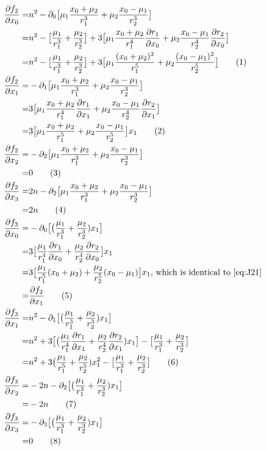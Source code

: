 \documentclass[]{article}
\newcommand\numberthis{\addtocounter{equation}{1}\tag{\theequation}}
\begin{document}
\begin{align*}
	\frac{\partial f_2}{\partial x_0} =& n^2 - \partial_0\big[\mu_1\frac{x_0+\mu_2}{r_1^3} + \mu_2\frac{x_0-\mu_1}{r_2^3}\big]\\
	=& n^2 -\big[\frac{\mu_1}{r_1^3} + \frac{\mu_2}{r_2^3}\big] + 3\big[\mu_1\frac{x_0+\mu_2}{r_1^4}\frac{\partial r_1}{\partial x_0} + \mu_2\frac{x_0-\mu_1}{r_2^4}\frac{\partial r_2}{\partial x_0}\big]\\
	=& n^2 -\big[\frac{\mu_1}{r_1^3} + \frac{\mu_2}{r_2^3}\big] + 3\big[\mu_1\frac{(x_0+\mu_2)^2}{r_1^5} + \mu_2\frac{(x_0-\mu_1)^2}{r_2^5}\big]\numberthis \label{eq:J20}\\
	\frac{\partial f_2}{\partial x_1} =& - \partial_1\big[\mu_1\frac{x_0+\mu_2}{r_1^3} + \mu_2\frac{x_0-\mu_1}{r_2^3}\big]\\
	=& 3 \big[\mu_1\frac{x_0+\mu_2}{r_1^4}\frac{\partial r_1}{\partial x_1} + \mu_2\frac{x_0-\mu_1}{r_2^4}\frac{\partial r_2}{\partial x_1}\big]\\
	=& 3 \big[\mu_1\frac{x_0+\mu_2}{r_1^5} + \mu_2\frac{x_0-\mu_1}{r_2^5}\big]x_1\numberthis \label{eq:J21}\\
	\frac{\partial f_2}{\partial x_2} =& - \partial_2\big[\mu_1\frac{x_0+\mu_2}{r_1^3} + \mu_2\frac{x_0-\mu_1}{r_2^3}\big]\\
	=& 0\numberthis \label{eq:J22}\\
	\frac{\partial f_2}{\partial x_3} =& 2n - \partial_2\big[\mu_1\frac{x_0+\mu_2}{r_1^3} + \mu_2\frac{x_0-\mu_1}{r_2^3}\big]\\
	=& 2n\numberthis \label{eq:J23}\\
	\frac{\partial f_3}{\partial x_0} =& - \partial_0\big[\big(\frac{\mu_1}{r_1^3} + \frac{\mu_2}{r_2^3})x_1\big]\\
	=& 3\big[\frac{\mu_1}{r_1^4}\frac{\partial r_1}{\partial x_0} + \frac{\mu_2}{r_2^4}\frac{\partial r_2}{\partial x_0}\big]x_1\\
	=& 3\big[\frac{\mu_1}{r_1^5}(x_0+\mu_2) + \frac{\mu_2}{r_2^5}(x_0-\mu_1)\big] x_1 \text{, which is identical to \eqref{eq:J21}} \\
	=& \frac{\partial f_2}{\partial x_1} \numberthis \label{eq:J30}\\
	\frac{\partial f_3}{\partial x_1} =& n^2- \partial_1\big[\big(\frac{\mu_1}{r_1^3} + \frac{\mu_2}{r_2^3})x_1\big]\\
	=& n^2  + 3 \big[\big(\frac{\mu_1}{r_1^4}\frac{\partial r_1}{\partial x_1} + \frac{\mu_2}{r_2^4}\frac{\partial r_2}{\partial x_1})x_1\big] - \big[\frac{\mu_1}{r_1^3} + \frac{\mu_2}{r_2^3}\big]\\
	=& n^2  + 3 \big(\frac{\mu_1}{r_1^5} + \frac{\mu_2}{r_2^5})x_1^2 - \big[\frac{\mu_1}{r_1^3} + \frac{\mu_2}{r_2^3}\big] \numberthis \label{eq:J31}\\
	\frac{\partial f_3}{\partial x_2} =& -2n - \partial_2\big[\big(\frac{\mu_1}{r_1^3} + \frac{\mu_2}{r_2^3})x_1\big]\\
	=& -2n \numberthis \label{eq:J32}\\
	\frac{\partial f_3}{\partial x_3} =& - \partial_3\big[\big(\frac{\mu_1}{r_1^3} + \frac{\mu_2}{r_2^3})x_1\big]\\
	=& 0 \numberthis \label{eq:J33}
\end{align*}
\end{document}

